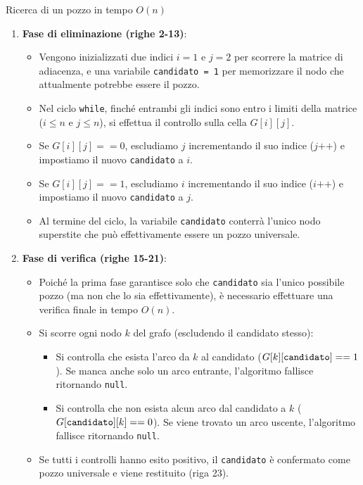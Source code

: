 \documentclass[12pt]{report}
\begin{document}
	\begin{algoritmo}{Ricerca di un pozzo in tempo $O(n)$}{}
		\begin{enumerate}
			\item \textbf{Fase di eliminazione (righe 2-13)}:
			\begin{itemize}
				\item Vengono inizializzati due indici $i = 1$ e $j = 2$ per scorrere la matrice di adiacenza, e una variabile \texttt{candidato = 1} per memorizzare il nodo che attualmente potrebbe essere il pozzo.
				\item Nel ciclo \texttt{while}, finché entrambi gli indici sono entro i limiti della matrice ($i \le n$ e $j \le n$), si effettua il controllo sulla cella $G[i][j]$.
				\item Se $G[i][j] == 0$, escludiamo $j$ incrementando il suo indice ($j\texttt{++}$) e impostiamo il nuovo \texttt{candidato} a $i$.
				\item Se $G[i][j] == 1$, escludiamo $i$ incrementando il suo indice ($i\texttt{++}$) e impostiamo il nuovo \texttt{candidato} a $j$.
				\item Al termine del ciclo, la variabile \texttt{candidato} conterrà l'unico nodo superstite che può effettivamente essere un pozzo universale.
			\end{itemize}
			
			\item \textbf{Fase di verifica (righe 15-21)}:
			\begin{itemize}
				\item Poiché la prima fase garantisce solo che \texttt{candidato} sia l'unico possibile pozzo (ma non che lo sia effettivamente), è necessario effettuare una verifica finale in tempo $O(n)$.
				\item Si scorre ogni nodo $k$ del grafo (escludendo il candidato stesso):
				\begin{itemize}
					\item Si controlla che esista l'arco da $k$ al candidato ($G[k][\text{\texttt{candidato}}] == 1$). Se manca anche solo un arco entrante, l'algoritmo fallisce ritornando \texttt{null}.
					\item Si controlla che non esista alcun arco dal candidato a $k$ ($G[\text{\texttt{candidato}}][k] == 0$). Se viene trovato un arco uscente, l'algoritmo fallisce ritornando \texttt{null}.
				\end{itemize}
				\item Se tutti i controlli hanno esito positivo, il \texttt{candidato} è confermato come pozzo universale e viene restituito (riga 23).
			\end{itemize}
		\end{enumerate}	
	\end{algoritmo}
	
\end{document}

